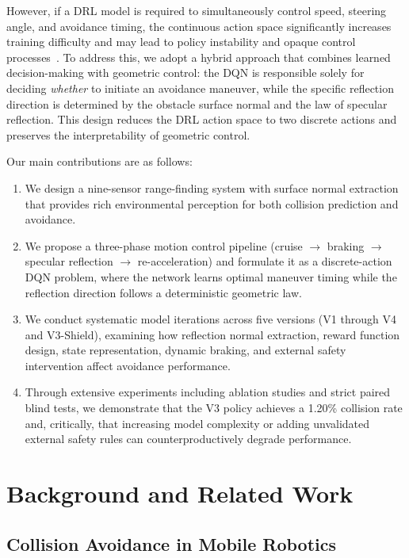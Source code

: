 \documentclass[conference]{IEEEtran}
\begin{document}
However, if a DRL model is required to simultaneously control speed, steering angle, and avoidance timing, the continuous action space significantly increases training difficulty and may lead to policy instability and opaque control processes~\cite{lillicrap2015continuous}. To address this, we adopt a hybrid approach that combines learned decision-making with geometric control: the DQN is responsible solely for deciding \emph{whether} to initiate an avoidance maneuver, while the specific reflection direction is determined by the obstacle surface normal and the law of specular reflection. This design reduces the DRL action space to two discrete actions and preserves the interpretability of geometric control.

Our main contributions are as follows:
\begin{enumerate}
    \item We design a nine-sensor range-finding system with surface normal extraction that provides rich environmental perception for both collision prediction and avoidance.
    \item We propose a three-phase motion control pipeline (cruise $\rightarrow$ braking $\rightarrow$ specular reflection $\rightarrow$ re-acceleration) and formulate it as a discrete-action DQN problem, where the network learns optimal maneuver timing while the reflection direction follows a deterministic geometric law.
    \item We conduct systematic model iterations across five versions (V1 through V4 and V3-Shield), examining how reflection normal extraction, reward function design, state representation, dynamic braking, and external safety intervention affect avoidance performance.
    \item Through extensive experiments including ablation studies and strict paired blind tests, we demonstrate that the V3 policy achieves a 1.20\% collision rate and, critically, that increasing model complexity or adding unvalidated external safety rules can counterproductively degrade performance.
\end{enumerate}

\section{Background and Related Work}

\subsection{Collision Avoidance in Mobile Robotics}
\end{document}
